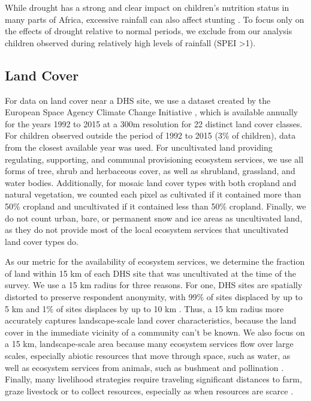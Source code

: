 \documentclass{article}
\begin{document}
While drought has a strong and clear impact on children's nutrition status in many parts of Africa, excessive rainfall can also affect stunting \cite{Cooper2019a, dimitrova2020monsoon}.  To focus only on the effects of drought relative to normal periods, we exclude from our analysis children observed during relatively high levels of rainfall (SPEI \textgreater 1).

\subsection{Land Cover}
For data on land cover near a DHS site, we use a dataset created by the European Space Agency Climate Change Initiative \cite{Defourny2017}, which is available annually for the years 1992 to 2015 at a 300m resolution for 22 distinct land cover classes.  For children observed outside the period of 1992 to 2015 (3\% of children), data from the closest available year was used. For uncultivated land providing regulating, supporting, and communal provisioning ecosystem services, we use all forms of tree, shrub and herbaceous cover, as well as shrubland, grassland, and water bodies.  Additionally, for mosaic land cover types with both cropland and natural vegetation, we counted each pixel as cultivated if it contained more than 50\% cropland and uncultivated if it contained less than 50\% cropland.  Finally, we do not count urban, bare, or permanent snow and ice areas as uncultivated land, as they do not provide most of the local ecosystem services that uncultivated land cover types do.

As our metric for the availability of ecosystem services, we determine the fraction of land within 15 km of each DHS site that was uncultivated at the time of the survey.  We use a 15 km radius for three reasons.  For one, DHS sites are spatially distorted to preserve respondent anonymity, with 99\% of sites displaced by up to 5 km and 1\% of sites displaces by up to 10 km \cite{Grace2012}.  Thus, a 15 km radius more accurately captures landscape-scale land cover characteristics, because the land cover in the immediate vicinity of a community can't be known.  We also focus on a 15 km, landscape-scale area because many ecosystem services flow over large scales, especially abiotic resources that move through space, such as water, as well as ecosystem services from animals, such as bushmeat and pollination \cite{Lopez-Hoffman2010}.  Finally, many livelihood strategies require traveling significant distances to farm, graze livestock or to collect resources, especially as when resources are scarce \cite{Felardo2016, Arku2010}.
\end{document}
